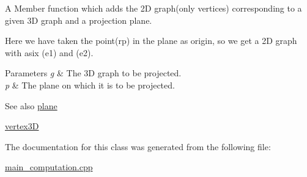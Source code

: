 A Member function which adds the 2D graph(only vertices) corresponding to a given 3D graph and a projection plane. 

Here we have taken the point(rp) in the plane as origin, so we get a 2D graph with asix (e1) and (e2). 
\begin{DoxyParams}{Parameters}
{\em g} & The 3D graph to be projected. \\
\hline
{\em p} & The plane on which it is to be projected. \\
\hline
\end{DoxyParams}
\begin{DoxySeeAlso}{See also}
\hyperlink{classplane}{plane} 

\hyperlink{classvertex3D}{vertex3D} 
\end{DoxySeeAlso}


The documentation for this class was generated from the following file\+:\begin{DoxyCompactItemize}
\item 
\hyperlink{main__computation_8cpp}{main\+\_\+computation.\+cpp}\end{DoxyCompactItemize}
